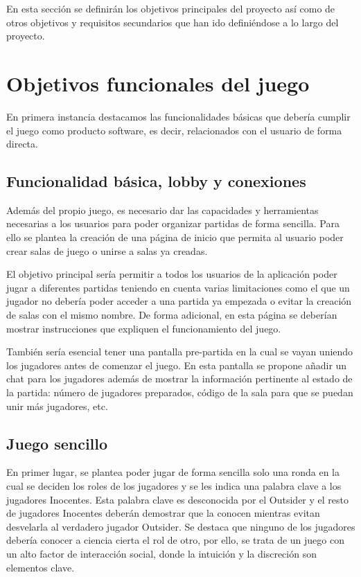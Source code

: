 En esta sección se definirán los objetivos principales del proyecto así como de otros objetivos y
requisitos secundarios que han ido definiéndose a lo largo del proyecto.

\section{Objetivos funcionales del juego} \label{Objetivos}

En primera instancia destacamos las funcionalidades básicas que debería cumplir el juego como
producto software, es decir, relacionados con el usuario de forma directa.

\subsection{Funcionalidad básica, lobby y conexiones}

Además del propio juego, es necesario dar las capacidades y herramientas necesarias a los usuarios para
poder organizar partidas de forma sencilla. Para ello se plantea la creación de una página de inicio que
permita al usuario poder crear salas de juego o unirse a salas ya creadas.

El objetivo principal sería permitir a todos los usuarios de la aplicación poder jugar a
diferentes partidas teniendo en cuenta varias limitaciones como el que un jugador no debería poder acceder
a una partida ya empezada o evitar la creación de salas con el mismo nombre. De forma adicional, en esta página se deberían mostrar instrucciones que expliquen el funcionamiento
del juego.

También sería esencial tener una pantalla pre-partida en la cual se vayan uniendo los jugadores
antes de comenzar el juego. En esta pantalla se propone añadir un chat para los jugadores además
de mostrar la información pertinente al estado de la partida: número de jugadores preparados, código de la
sala para que se puedan unir más jugadores, etc.

\subsection{Juego sencillo}

En primer lugar, se plantea poder jugar de forma sencilla solo una ronda en la cual se deciden los
roles de los jugadores y se les indica una palabra clave a los jugadores Inocentes. Esta palabra 
clave es desconocida por el Outsider y el resto de jugadores Inocentes deberán demostrar 
que la conocen mientras evitan desvelarla al verdadero jugador Outsider. Se destaca 
que ninguno de los jugadores debería conocer a ciencia cierta el rol de otro, por ello, se trata de un juego 
con un alto factor de interacción social, donde la intuición y la discreción son elementos clave.

